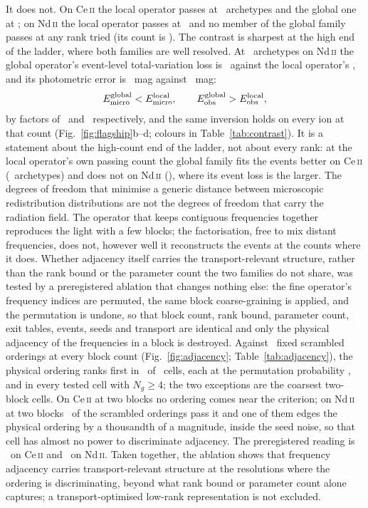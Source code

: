 \documentclass[aps,prl,twocolumn,superscriptaddress,nofootinbib,longbibliography]{revtex4-2}
\begin{document}
It does not. On Ce\,\textsc{ii} the local operator passes at
\PBCeKlocal\ archetypes and the global one at \PBCeKglobal; on
Nd\,\textsc{ii} the local operator passes at \PBNdKlocal\ and no member
of the global family passes at any rank tried (its count is
\PBNdKglobal). The contrast is sharpest at the high end of the ladder,
where both families are well resolved. At \PBContrastK\ archetypes on
Nd\,\textsc{ii} the global operator's event-level total-variation loss is
\PBNdEventGlobal\ against the local operator's \PBNdEventLocal, and its
photometric error is \PBNdBandGlobal~mag against \PBNdBandLocal~mag:
\begin{equation}
E_{\rm micro}^{\rm global} < E_{\rm micro}^{\rm local},\qquad
E_{\rm obs}^{\rm global} > E_{\rm obs}^{\rm local},
\label{eq:inversion}
\end{equation}
by factors of \PBNdEventRatio\ and \PBNdBandRatio\ respectively, and the
same inversion holds on every ion at that count
(Fig.~\ref{fig:flagship}b--d; colours in Table~\ref{tab:contrast}). It is
a statement about the high-count end of the ladder, not about every rank:
at the local operator's own passing count the global family fits the
events better on Ce\,\textsc{ii} (\PBCeKlocal\ archetypes) and does not
on Nd\,\textsc{ii} (\PBNdKlocal), where its event loss is the larger. The
degrees of freedom that minimise a generic distance between microscopic
redistribution distributions are not the degrees of freedom that carry the
radiation field. The operator that keeps contiguous frequencies together
reproduces the light with a few blocks; the factorisation, free to mix
distant frequencies, does not, however well it reconstructs the events at
the counts where it does. Whether adjacency itself carries the
transport-relevant structure, rather than the rank bound or the parameter
count the two families do not share, was tested by a preregistered
ablation that changes nothing else: the fine operator's frequency
indices are permuted, the same block coarse-graining is applied, and the
permutation is undone, so that block count, rank bound, parameter count,
exit tables, events, seeds and transport are identical and only the
physical adjacency of the frequencies in a block is destroyed. Against
\PBNScrambled\ fixed scrambled orderings at every block count
(Fig.~\ref{fig:adjacency}; Table~\ref{tab:adjacency}), the physical
ordering ranks first in \PBAdjFirst\ of \PBAdjCells\ cells, each at the
permutation probability \PBAdjP, and in every tested cell with
$N_g\ge4$; the two exceptions are the coarsest two-block cells. On
Ce\,\textsc{ii} at two blocks no ordering comes near the criterion; on
Nd\,\textsc{ii} at two blocks \PBNdAdjScrPass\ of the scrambled
orderings pass it and one of them edges the physical ordering by a
thousandth of a magnitude, inside the seed noise, so that cell has almost
no power to discriminate adjacency. The preregistered reading is
\PBCeGtwoR\ on Ce\,\textsc{ii} and \PBNdGtwoR\ on Nd\,\textsc{ii}.
Taken together, the ablation shows that frequency adjacency carries
transport-relevant structure at the resolutions where the ordering is
discriminating, beyond what rank bound or parameter count alone captures;
a transport-optimised low-rank representation is not excluded.
\end{document}
